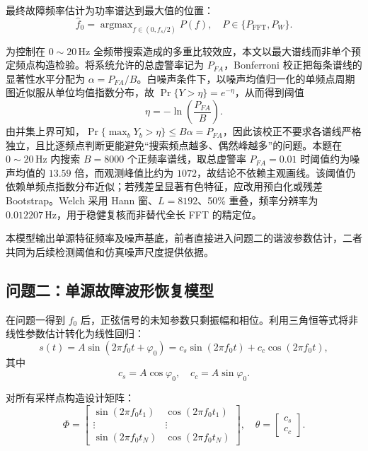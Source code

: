 \documentclass[withoutpreface,bwprint]{cumcmthesis}
\begin{document}
最终故障频率估计为功率谱达到最大值的位置：
\begin{equation}
    \hat f_0=
    \mathop{\arg\max}_{f\in(0,f_s/2)}P(f),
    \quad
    P\in\{P_{\mathrm{FFT}},P_W\}.
    \label{eq:f0est}
\end{equation}

为控制在 \(0\sim20\,\mathrm{Hz}\) 全频带搜索造成的多重比较效应，本文以最大谱线而非单个预定频点构造检验。将系统允许的总虚警率记为 \(P_{FA}\)，Bonferroni 校正把每条谱线的显著性水平分配为 \(\alpha=P_{FA}/B\)。白噪声条件下，以噪声均值归一化的单频点周期图近似服从单位均值指数分布，故 \(\Pr\{Y>\eta\}=e^{-\eta}\)，从而得到阈值
\begin{equation}
 \eta=-\ln\!\left(\frac{P_{FA}}{B}\right).
 \label{eq:global-threshold}
\end{equation}
由并集上界可知，\(\Pr\{\max_bY_b>\eta\}\leq B\alpha=P_{FA}\)，因此该校正不要求各谱线严格独立，且比逐频点判断更能避免“搜索频点越多、偶然峰越多”的问题。本题在 \(0\sim20\,\mathrm{Hz}\) 内搜索 \(B=8000\) 个正频率谱线，取总虚警率 \(P_{FA}=0.01\) 时阈值约为噪声均值的 \(13.59\) 倍，而观测峰值比约为 \(1072\)，故结论不依赖主观画线。该阈值仍依赖单频点指数分布近似；若残差呈显著有色特征，应改用预白化或残差 Bootstrap。Welch 采用 Hann 窗、\(L=8192\)、50\% 重叠，频率分辨率为 \(0.012207\,\mathrm{Hz}\)，用于稳健复核而非替代全长 FFT 的精定位。

本模型输出单源特征频率及噪声基底，前者直接进入问题二的谐波参数估计，二者共同为后续检测阈值和仿真噪声尺度提供依据。

\subsection{问题二：单源故障波形恢复模型}

在问题一得到 \(f_0\) 后，正弦信号的未知参数只剩振幅和相位。利用三角恒等式将非线性参数估计转化为线性回归：
\begin{equation}
    s(t)=A\sin(2\pi f_0t+\varphi_0)
    =c_s\sin(2\pi f_0t)+c_c\cos(2\pi f_0t),
    \label{eq:linreg}
\end{equation}
其中
\[
    c_s=A\cos\varphi_0,\quad
    c_c=A\sin\varphi_0 .
\]

对所有采样点构造设计矩阵：
\begin{equation}
    \Phi=
    \begin{bmatrix}
    \sin(2\pi f_0 t_1) & \cos(2\pi f_0 t_1)\\
    \vdots & \vdots\\
    \sin(2\pi f_0 t_N) & \cos(2\pi f_0 t_N)
    \end{bmatrix},
    \quad
    \theta=
    \begin{bmatrix}
    c_s\\
    c_c
    \end{bmatrix}.
    \label{eq:design}
\end{equation}
\end{document}

